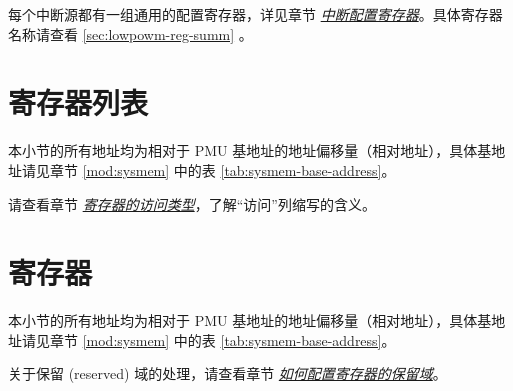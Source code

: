 \documentclass[main\_\_CN.tex]{subfiles}
\begin{document}
每个中断源都有一组通用的配置寄存器，详见章节 \hyperref[interrupt-config-registers]{\textit{中断配置寄存器}}。具体寄存器名称请查看 \ref{sec:lowpowm-reg-summ} \textit{}。

\clearpage
\section{寄存器列表}\hypertarget{lowpowm-reg-summ}{}\label{sec:lowpowm-reg-summ}

本小节的所有地址均为相对于 PMU 基地址的地址偏移量（相对地址），具体基地址请见章节 \ref{mod:sysmem} \textit{} 中的表 \ref{tab:sysmem-base-address}。

请查看章节 \hyperref[glossary-access-types]{\textit{寄存器的访问类型}}，了解“访问”列缩写的含义。



\section{寄存器}

本小节的所有地址均为相对于 PMU 基地址的地址偏移量（相对地址），具体基地址请见章节 \ref{mod:sysmem} \textit{} 中的表 \ref{tab:sysmem-base-address}。

关于保留 (reserved) 域的处理，请查看章节 \hyperref[programming-reserved-field]{\textit{如何配置寄存器的保留域}}。


\end{document}
